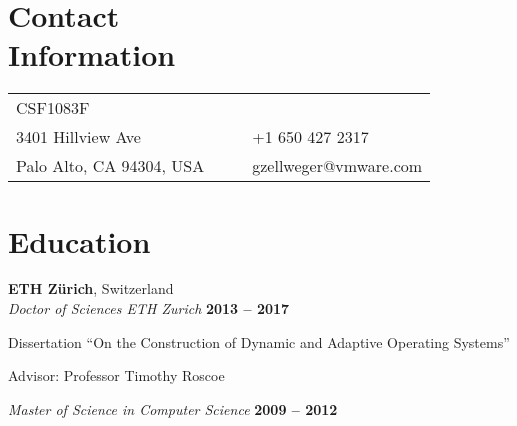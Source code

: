 \documentclass[margin,line]{cv/cv}
\begin{document}
\begin{resume}

    \section{\mysidestyle Contact\\Information}

    \begin{tabularx}{\textwidth}{lXcl}
        CSF1083F                                                                         \\
        3401 Hillview Ave        &  & \raisebox{-3pt}{\Phone}    & +1 650 427 2317       \\
        Palo Alto, CA 94304, USA &  & \raisebox{-3pt}{\Envelope} & gzellweger@vmware.com \\
    \end{tabularx}

    \section{\mysidestyle  Education}

    \textbf{ETH Zürich}, Switzerland \vspace{2mm}\\\vspace{1mm}%
    \textsl{Doctor of Sciences ETH Zurich} \hfill \textbf{2013 -- 2017}\vspace{-3mm}\\\vspace{-1mm}%
    \begin{list2}
        \item Dissertation ``On the Construction of Dynamic and Adaptive Operating Systems''
        \item Advisor: Professor Timothy Roscoe
    \end{list2}\vspace{-1.5mm}

    \textsl{Master of Science in Computer Science} \hfill \textbf{2009 -- 2012}\vspace{-3mm}\\\vspace{-1mm}%


\end{resume}
\end{document}
